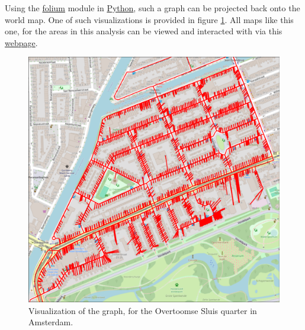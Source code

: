 Using the \url{folium} module in \url{Python}, such a graph can be projected back onto the world map.
One of such visualizations is provided in figure \ref{fig:overtoomse_sluis}. All maps like this one,
for the areas in this analysis can be viewed and interacted with via this 
\href{https://koenstevens.nl/wp-content/uploads/maps/}{\url{webpage}}.
\begin{figure}[H]
  \caption{Visualization of the graph, for the Overtoomse Sluis quarter in Amsterdam.}
  \label{fig:overtoomse_sluis}
  \includegraphics[width=\textwidth]{Pictures/Overtoomse_Sluis_roads.png}
\end{figure}

